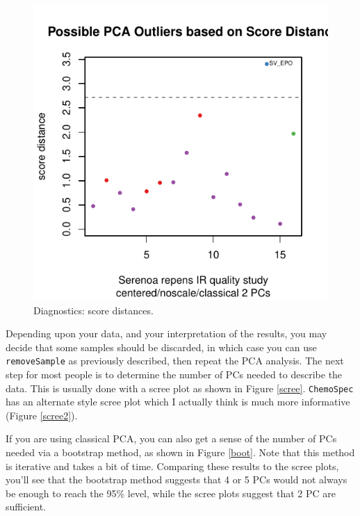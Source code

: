 \documentclass[letter,10pt,twocolumn,twoside,printwatermark=false]{pinp}
\begin{document}
\begin{figure}

{\centering \includegraphics{ChemoSpec2_files/figure-latex/Chunk23-1} 

}

\caption{\label{SD}Diagnostics: score distances.}\label{fig:Chunk23}
\end{figure}

Depending upon your data, and your interpretation of the results, you
may decide that some samples should be discarded, in which case you can
use \texttt{removeSample} as previously described, then repeat the PCA
analysis. The next step for most people is to determine the number of
PCs needed to describe the data. This is usually done with a scree plot
as shown in Figure \ref{scree}. \texttt{ChemoSpec} has an alternate
style scree plot which I actually think is much more informative (Figure
\ref{scree2}).

If you are using classical PCA, you can also get a sense of the number
of PCs needed via a bootstrap method, as shown in Figure \ref{boot}.
Note that this method is iterative and takes a bit of time. Comparing
these results to the scree plots, you'll see that the bootstrap method
suggests that 4 or 5 PCs would not always be enough to reach the 95\%
level, while the scree plots suggest that 2 PC are sufficient.
\end{document}
